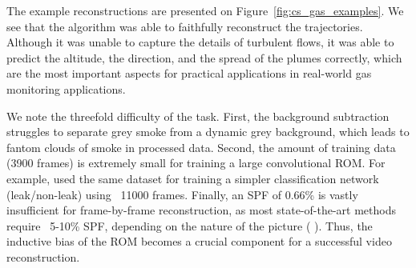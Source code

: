 The example reconstructions are presented on Figure~\ref{fig:cs_gas_examples}. We see that the algorithm was able to faithfully reconstruct the trajectories. Although it was unable to capture the details of turbulent flows, it was able to predict the altitude, the direction, and the spread of the plumes correctly, which are the most important aspects for practical applications in real-world gas monitoring applications. 

We note the threefold difficulty of the task. First, the background subtraction struggles to separate grey smoke from a dynamic grey background, which leads to fantom clouds of smoke in processed data. Second, the amount of training data (3900 frames) is extremely small for training a large convolutional ROM. For example, \citep{wang2020machine} used the same dataset for training a simpler classification network (leak/non-leak) using ~11000 frames. Finally, an SPF of 0.66\% is vastly insufficient for frame-by-frame reconstruction, as most state-of-the-art methods require ~5-10\% SPF, depending on the nature of the picture (	\citep{wang2022single}). Thus, the inductive bias of the ROM becomes a crucial component for a successful video reconstruction.


